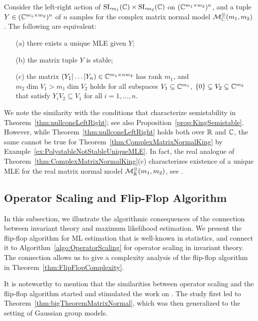 \begin{theorem}
	\label{thm:ComplexMatrixNormalKing}
	Consider the left-right action of $\operatorname{SL}_{m_1}(\mathbb C) \times \operatorname{SL}_{m_2}(\mathbb C)$ on $(\mathbb C^{m_1 \times m_2})^n$,
	and a tuple $Y \in (\mathbb C^{m_1 \times m_2})^n$ of $n$ samples for the complex matrix normal model $\mathcal{M}^{\otimes}_{\mathbb C}(m_1,m_2)$.
	The following are equivalent:
	\begin{itemize}
		\item[(a)] there exists a unique MLE given $Y$;
		\item[(b)] the matrix tuple $Y$ is stable; 
		\item[(c)] the matrix $(Y_1 | \ldots | Y_n) \in \mathbb C^{m_1 \times n m_2}$ has rank $m_1$, and
		$
		m_2 \dim V_1 > m_1 \dim V_2
		$
		holds for all subspaces  $V_1 \subseteq \mathbb C^{m_1}$, $\lbrace 0 \rbrace \subsetneq V_2 \subsetneq \mathbb C^{m_2}$ that satisfy $Y_i V_2 \subseteq V_1$ for all $i=1,\ldots,n$.
	\end{itemize}
\end{theorem}

We note the similarity with the conditions that characterize semistability in Theorem~\ref{thm:nullconeLeftRight}; see also Proposition~\ref{prop:KingSemistable}.
However, while Theorem~\ref{thm:nullconeLeftRight} holds both over $\mathbb R$ and $\mathbb C$, the same cannot be true for Theorem~\ref{thm:ComplexMatrixNormalKing} by Example~\ref{ex:PolystableNotStableUniqueMLE}.
In fact, the real analogue of Theorem~\ref{thm:ComplexMatrixNormalKing}(c) characterizes  existence of a unique MLE for the real matrix normal model $\mathcal{M}^{\otimes}_{\mathbb R}(m_1,m_2)$, see \cite[Theorems~3.1(ii) and 3.3(ii)]{DrtonKurikiHoff}.



\subsection{Operator Scaling and Flip-Flop Algorithm}\label{subsec:FlipFlopVsOperatorScaling}

In this subsection, we illustrate the algorithmic consequences of the connection between invariant theory and maximum likelihood estimation.
We present the flip-flop algorithm for ML estimation that is well-known in statistics, and connect it to Algorithm~\ref{algo:OperatorScaling} for operator scaling in invariant theory.
The connection allows us to give a complexity analysis of the flip-flop algorithm in Theorem~\ref{thm:FlipFlopComplexity}.

It is noteworthy to mention that the similarities between operator scaling and the flip-flop algorithm started and stimulated the work on \cite{SiagaPaper}. The study first led to Theorem~\ref{thm:bigTheoremMatrixNormal}, which was then generalized to the setting of Gaussian group models.

